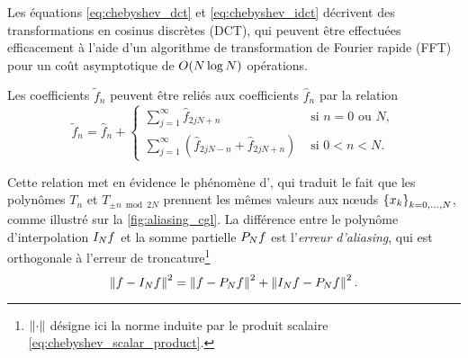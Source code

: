 Les équations \eqref{eq:chebyshev_dct} et \eqref{eq:chebyshev_idct} décrivent des transformations en cosinus discrètes (DCT), qui peuvent être effectuées efficacement à l'aide d'un algorithme de transformation de Fourier rapide (FFT) pour un coût asymptotique de $\bigO{N \log N}$ opérations.
\par
Les coefficients $\tilde{f}_n$ peuvent être reliés aux coefficients $\hat{f}_n$ par la relation
\begin{equation}
	\tilde{f}_n = \hat{f}_n + 
	\begin{cases}
		\displaystyle\sum_{j=1}^{\infty} \hat{f}_{2jN + n} & \text{\ si\ } n = 0 \text{\ ou\ } N,   \\[4ex]
		\displaystyle\sum_{j=1}^{\infty} \left( \hat{f}_{2jN - n} + \hat{f}_{2jN + n} \right) & \text{\ si\ } 0 < n < N. 
	\end{cases}
	\label{eq:chebyshev_aliasing}
\end{equation}

Cette relation met en évidence le phénomène d', qui traduit le fait que les polynômes $T_n$ et $T_{\pm n \bmod{2N}}$ prennent les mêmes valeurs aux n\oe uds $\family{x}{k}{0}{N}$, comme illustré sur la \autoref{fig:aliasing_cgl}.
La différence entre le polynôme d'interpolation $\interpolant{f}{N}$ et la somme partielle $\truncseries{f}{N}$ est l'\textit{erreur d'aliasing}, qui est orthogonale à l'erreur de troncature\footnote{$\normtwo{\cdot}$ désigne ici la norme induite par le produit scalaire \eqref{eq:chebyshev_scalar_product}.}
\begin{equation}
	\normtwo{f - \interpolant{f}{N}}^2 = 
	\normtwo{f - \truncseries{f}{N}}^2 + 
	\normtwo{\interpolant{f}{N} - \truncseries{f}{N}}^2.
	\label{eq:chebyshev_aliasing_esrror}
\end{equation}


